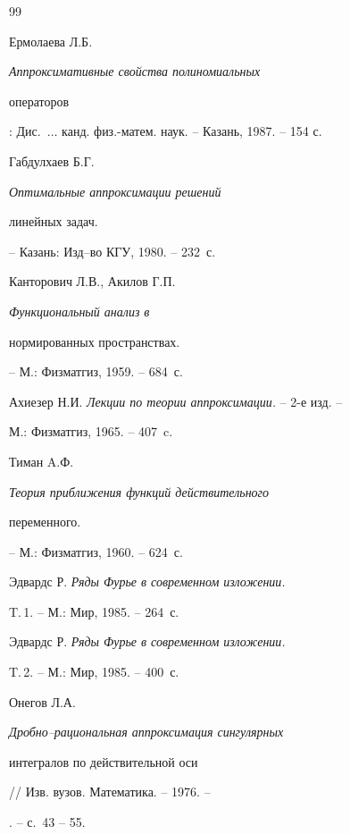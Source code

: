 \begin{thebibliography}{99}


Ермолаева Л.Б. {\em Аппроксимативные свойства полиномиальных


операторов}: Дис.~$\dots$ канд. физ.-матем. наук. -- Казань, 1987. -- 154 с.







Габдулхаев Б.Г. {\em Оптимальные аппроксимации решений


линейных задач.} -- Казань: Изд--во КГУ, 1980. -- 232~с.







Канторович Л.В., Акилов Г.П. {\em Функциональный анализ в


нормированных пространствах.} -- М.: Физматгиз, 1959. -- 684~с.







Ахиезер Н.И. {\em Лекции по теории аппроксимации.} -- 2-е изд. --


М.: Физматгиз, 1965. -- 407~c.







Тиман A.Ф. {\em Теория приближения функций действительного


переменного.} -- М.: Физматгиз, 1960. -- 624~с.







Эдвардс Р. {\em Ряды Фурье в современном изложении.} 


T.\,1. -- М.: Мир, 1985. -- 264~с.







Эдвардс Р. {\em Ряды Фурье в современном изложении.} 


T.\,2. -- М.: Мир, 1985. -- 400~с.







Онегов Л.А. {\em Дробно--рациональная аппроксимация сингулярных


интегралов по действительной оси} // Изв. вузов. Математика. -- 1976. --


. -- с.~43 -- 55.





\end{thebibliography}





\vskip 1cm





\medskip


















